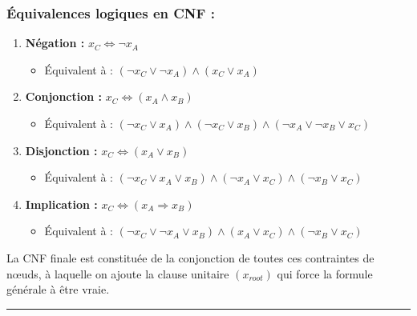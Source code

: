 \documentclass[11pt,a4paper]{article}
\begin{document}
\hypertarget{uxe9quivalences-logiques-en-cnf}{%
\subsubsection{Équivalences logiques en CNF
:}\label{uxe9quivalences-logiques-en-cnf}}

\begin{enumerate}
\def\labelenumi{\arabic{enumi}.}
\tightlist
\item
  \textbf{Négation :} \(x_C \Leftrightarrow \neg x_A\)

  \begin{itemize}
  \tightlist
  \item
    Équivalent à : \((\neg x_C \lor \neg x_A) \land (x_C \lor x_A)\)
  \end{itemize}
\item
  \textbf{Conjonction :} \(x_C \Leftrightarrow (x_A \land x_B)\)

  \begin{itemize}
  \tightlist
  \item
    Équivalent à :
    \((\neg x_C \lor x_A) \land (\neg x_C \lor x_B) \land (\neg x_A \lor \neg x_B \lor x_C)\)
  \end{itemize}
\item
  \textbf{Disjonction :} \(x_C \Leftrightarrow (x_A \lor x_B)\)

  \begin{itemize}
  \tightlist
  \item
    Équivalent à :
    \((\neg x_C \lor x_A \lor x_B) \land (\neg x_A \lor x_C) \land (\neg x_B \lor x_C)\)
  \end{itemize}
\item
  \textbf{Implication :} \(x_C \Leftrightarrow (x_A \Rightarrow x_B)\)

  \begin{itemize}
  \tightlist
  \item
    Équivalent à :
    \((\neg x_C \lor \neg x_A \lor x_B) \land (x_A \lor x_C) \land (\neg x_B \lor x_C)\)
  \end{itemize}
\end{enumerate}

La CNF finale est constituée de la conjonction de toutes ces contraintes
de nœuds, à laquelle on ajoute la clause unitaire \((x_{root})\) qui
force la formule générale à être vraie.

\begin{center}\rule{0.5\linewidth}{0.5pt}\end{center}
\end{document}
